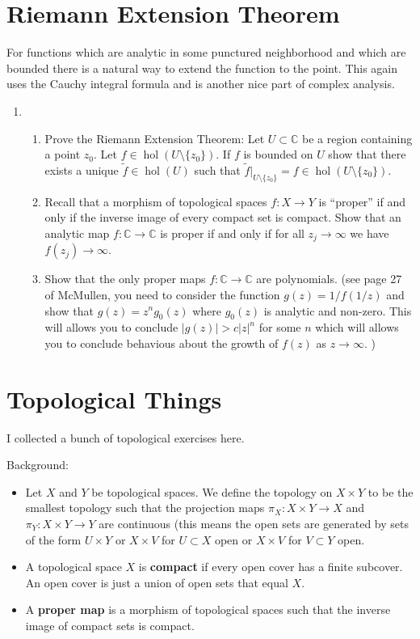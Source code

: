 \documentclass[a4paper,10pt]{article}
\newcommand{\CC}{\mathbb{C}}
\newcommand{\hol}{\operatorname{hol}}
\begin{document}
\section{Riemann Extension Theorem}
For functions which are analytic in some punctured neighborhood and which are bounded there is a natural way to extend the function to the point. This again uses the Cauchy integral formula and is another nice part of complex analysis.

\begin{enumerate}
	\item 
\begin{enumerate}
	\item Prove the Riemann Extension Theorem: Let $U\subset \CC$ be a region containing a point $z_0$. 
	Let $f \in \hol(U\setminus \lbrace z_0 \rbrace)$.
	If $f$ is bounded on $U$ show that there exists a unique $\widetilde{f} \in \hol(U)$ such that $\widetilde{f}\vert_{U \setminus \lbrace z_0 \rbrace} = f \in \hol(U \setminus \lbrace z_0 \rbrace )$.
	\item Recall that a morphism of topological spaces $f: X \to Y$ is ``proper'' if and only if the inverse image of every compact set is compact. 
	Show that an analytic map $f:\CC \to \CC$ is proper if and only if for all $z_j \to \infty$ we have $f(z_j) \to \infty$. 
	\item Show that the only proper maps $f:\CC \to \CC$ are polynomials. (see page 27 of McMullen, you need to consider the function $g(z) = 1/f(1/z)$ and show that $g(z) = z^n g_0(z)$ where $g_0(z)$ is analytic and non-zero. This will allows you to conclude $\vert g(z) \vert > c\vert z \vert^n$ for some $n$ which will allows you to conclude behavious about the growth of $f(z)$ as $z \to \infty$. )
\end{enumerate}
\end{enumerate}


\newpage
\section{Topological Things}
I collected a bunch of topological exercises here. 

	Background: 
\begin{itemize}
	\item Let $X$ and $Y$ be topological spaces. We define the topology on $X\times Y$ to be the smallest topology such that the projection maps $\pi_X: X \times Y \to X$ and $\pi_Y: X\times Y \to Y$ are continuous (this means the open sets are generated by sets of the form $U \times Y$ or $X\times V$ for $U\subset X$ open or $X \times V$ for $V\subset Y$ open. 
	\item A topological space $X$ is \textbf{compact} if every open cover has a finite subcover. An open cover is just a union of open sets that equal $X$.
	\item A \textbf{proper map} is a morphism of topological spaces such that the inverse image of compact sets is compact. 
\end{itemize}
\end{document}
